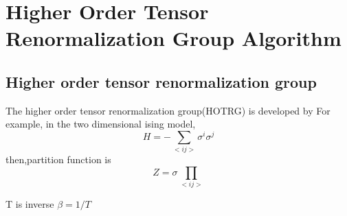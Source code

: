 \chapter{Higher Order Tensor Renormalization Group Algorithm}\label{chap:method}

\section{Higher order tensor renormalization group}
The higher order tensor renormalization group(HOTRG)\cite{hotrg} is developed by 
For example, in the two dimensional ising model, 
\begin{equation}
H=-\sum_{<ij>}\sigma^{i}\sigma^{j}
\end{equation} 
then,partition function is 
\begin{equation}
Z=\sigma_{}\prod_{<ij>}
\end{equation}

T is inverse $\beta=1/T$
